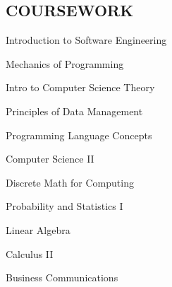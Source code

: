 \documentclass[line, margin]{res}
\begin{document}
\begin{resume}
\section{COURSEWORK}


      \begin{enumerate*}[series=MyList, before=\hspace{-0.6ex}, label=\textbullet]
        \item Introduction to Software Engineering
        \item Mechanics of Programming
        \item Intro to Computer Science Theory
        \item Principles of Data Management
        \item Programming Language Concepts
        \item Computer Science II
        \item Discrete Math for Computing
        \item Probability and Statistics I
        \item Linear Algebra
        \item Calculus II
        \item Business Communications
      \end{enumerate*}


 
\end{resume}
\end{document}
